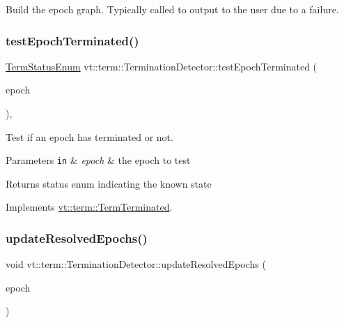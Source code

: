 Build the epoch graph. Typically called to output to the user due to a failure. 

\mbox{\label{structvt_1_1term_1_1_termination_detector_a1d3cebd2600b5a3900dd9954de55cf35}} 
\subsubsection{\texorpdfstring{test\+Epoch\+Terminated()}{testEpochTerminated()}}
{\footnotesize\ttfamily \hyperlink{namespacevt_1_1term_ad8ec9b371608fc88e7fdeef219785b27}{Term\+Status\+Enum} vt\+::term\+::\+Termination\+Detector\+::test\+Epoch\+Terminated (\begin{DoxyParamCaption}\item[{\hyperlink{namespacevt_a985a5adf291c34a3ca263b3378388236}{Epoch\+Type}}]{epoch }\end{DoxyParamCaption})\hspace{0.3cm}{\ttfamily [override]}, {\ttfamily [virtual]}}



Test if an epoch has terminated or not. 


\begin{DoxyParams}[1]{Parameters}
\mbox{\tt in}  & {\em epoch} & the epoch to test\\
\hline
\end{DoxyParams}
\begin{DoxyReturn}{Returns}
status enum indicating the known state 
\end{DoxyReturn}


Implements \hyperlink{structvt_1_1term_1_1_term_terminated_a9d23b646c13a95738f72f7abfc8774c7}{vt\+::term\+::\+Term\+Terminated}.

\mbox{\label{structvt_1_1term_1_1_termination_detector_a7637035e3f3c0f898d8dc79bbc2d8bf4}} 
\subsubsection{\texorpdfstring{update\+Resolved\+Epochs()}{updateResolvedEpochs()}}
{\footnotesize\ttfamily void vt\+::term\+::\+Termination\+Detector\+::update\+Resolved\+Epochs (\begin{DoxyParamCaption}\item[{\hyperlink{namespacevt_a985a5adf291c34a3ca263b3378388236}{Epoch\+Type} const \&}]{epoch }\end{DoxyParamCaption})\hspace{0.3cm}{\ttfamily [private]}}



